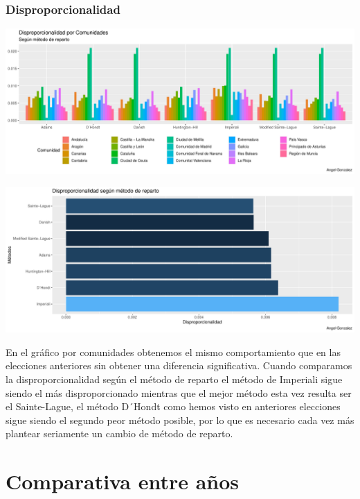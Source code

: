 \documentclass[12pt,a4paper,]{book}
\numberwithin{dummy}{section}
\theoremstyle{ocrenumbox}
\theoremstyle{blacknumex}
\theoremstyle{blacknumbox}
\theoremstyle{ocrenum}
\theoremstyle{ocrenum}
\begin{document}
\hypertarget{disproporcionalidad-14}{%
\subsubsection{Disproporcionalidad}\label{disproporcionalidad-14}}

\begin{center}\includegraphics[width=0.95\linewidth]{figurasR/unnamed-chunk-186-1} \end{center}

\begin{center}\includegraphics[width=0.95\linewidth]{figurasR/unnamed-chunk-186-2} \end{center}

En el gráfico por comunidades obtenemos el mismo comportamiento que en
las elecciones anteriores sin obtener una diferencia significativa.
Cuando comparamos la disproporcionalidad según el método de reparto el
método de Imperiali sigue siendo el más disproporcionado mientras que el
mejor método esta vez resulta ser el Sainte-Lague, el método D´Hondt
como hemos visto en anteriores elecciones sigue siendo el segundo peor
método posible, por lo que es necesario cada vez más plantear seriamente
un cambio de método de reparto.

\hypertarget{comparativa-entre-auxf1os}{%
\section{Comparativa entre años}\label{comparativa-entre-auxf1os}}
\end{document}
